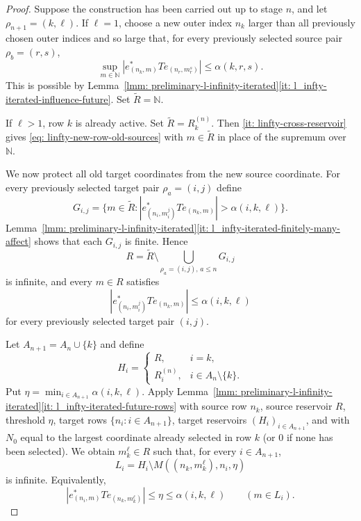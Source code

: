 \documentclass[11pt]{amsart}
\theoremstyle{plain}
\theoremstyle{definition}
\numberwithin{equation}{section}
\newcommand{\N}{\mathbb{N}}
\renewcommand{\le}{\leqslant}
\renewcommand{\leq}{\leqslant}
\begin{document}
\begin{proof}
    Suppose the construction has been carried out up to stage $n$, and let $\rho_{n+1}=(k,\ell)$. If $\ell=1$, choose a new outer index $n_k$ larger than all previously chosen outer indices and so large that, for every previously selected source pair $\rho_b=(r,s)$,
    \begin{equation}\label{eq: linfty-new-row-old-sources}
        \sup_{m\in\N}|e^*_{(n_k,m)}Te_{(n_r,m_r^s)}|\leq \alpha(k,r,s).
    \end{equation}
    This is possible by Lemma~\ref{lmm: preliminary-l-infinity-iterated}\ref{it: l_infty-iterated-influence-future}. Set $\widetilde R=\N$.

    If $\ell>1$, row $k$ is already active. Set $\widetilde R=R_k^{(n)}$. Then \ref{it: linfty-cross-reservoir} gives \eqref{eq: linfty-new-row-old-sources} with $m\in\widetilde R$ in place of the supremum over $\N$.

    We now protect all old target coordinates from the new source coordinate. For every previously selected target pair $\rho_a=(i,j)$ define
    \begin{equation*}
        G_{i,j}=\{m\in\widetilde R: |e^*_{(n_i,m_i^j)}Te_{(n_k,m)}|>\alpha(i,k,\ell)\}.
    \end{equation*}
    Lemma~\ref{lmm: preliminary-l-infinity-iterated}\ref{it: l_infty-iterated-finitely-many-affect} shows that each $G_{i,j}$ is finite. Hence
    \begin{equation*}
        R=\widetilde R\setminus\bigcup_{\rho_a=(i,j),\,a\le n}G_{i,j}
    \end{equation*}
    is infinite, and every $m\in R$ satisfies
    \begin{equation}\label{eq: linfty-old-target-new-source}
        |e^*_{(n_i,m_i^j)}Te_{(n_k,m)}|\leq\alpha(i,k,\ell)
    \end{equation}
    for every previously selected target pair $(i,j)$.

    Let $A_{n+1}=A_n\cup\{k\}$ and define
    \begin{equation*}
        H_i=
        \begin{cases}
            R, & i=k,\\
            R_i^{(n)}, & i\in A_n\setminus\{k\}.
        \end{cases}
    \end{equation*}
    Put $\eta=\min_{i\in A_{n+1}}\alpha(i,k,\ell)$. Apply Lemma~\ref{lmm: preliminary-l-infinity-iterated}\ref{it: l_infty-iterated-future-rows} with source row $n_k$, source reservoir $R$, threshold $\eta$, target rows $\{n_i:i\in A_{n+1}\}$, target reservoirs $(H_i)_{i\in A_{n+1}}$, and with $N_0$ equal to the largest coordinate already selected in row $k$ (or $0$ if none has been selected). We obtain $m_k^\ell\in R$ such that, for every $i\in A_{n+1}$,
    \begin{equation*}
        L_i=H_i\setminus M((n_k,m_k^\ell),n_i,\eta)
    \end{equation*}
    is infinite. Equivalently,
    \begin{equation}\label{eq: linfty-new-source-future-targets}
        |e^*_{(n_i,m)}Te_{(n_k,m_k^\ell)}|\leq \eta\leq\alpha(i,k,\ell)
        \qquad(m\in L_i).
    \end{equation}


\end{proof}
\end{document}
